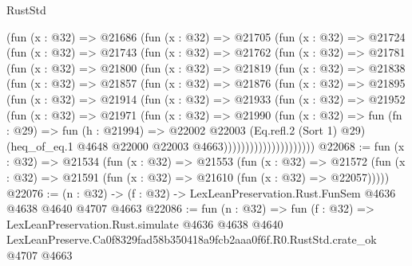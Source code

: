 \begin{lexlean}{RustStd}
\begin{coremodule}
        (fun (x : @32) =>
        @21686
          (fun (x : @32) =>
          @21705
            (fun (x : @32) =>
            @21724
              (fun (x : @32) =>
              @21743
                (fun (x : @32) =>
                @21762
                  (fun (x : @32) =>
                  @21781
                    (fun (x : @32) =>
                    @21800
                      (fun (x : @32) =>
                      @21819
                        (fun (x : @32) =>
                        @21838
                          (fun (x : @32) =>
                          @21857
                            (fun (x : @32) =>
                            @21876
                              (fun (x : @32) =>
                              @21895
                                (fun (x : @32) =>
                                @21914
                                  (fun (x : @32) =>
                                  @21933
                                    (fun (x : @32) =>
                                    @21952
                                      (fun (x : @32) =>
                                      @21971
                                        (fun (x : @32) =>
                                        @21990
                                          (fun (x : @32) =>
                                          fun (fn : @29) =>
                                          fun (h : @21994) =>
                                          @22002
                                            @22003
                                            (Eq.refl.{2} (Sort 1) @29)
                                            (heq_of_eq.{1}
                                              @4648
                                              @22000
                                              @22003
                                              @4663)))))))))))))))))))))
@22068 := fun (x : @32) =>
  @21534
    (fun (x : @32) =>
    @21553
      (fun (x : @32) =>
      @21572 (fun (x : @32) => @21591 (fun (x : @32) => @21610 (fun (x : @32) => @22057)))))
@22076 := (n : @32) -> (f : @32) -> LexLeanPreservation.Rust.FunSem @4636 @4638 @4640 @4707 @4663
@22086 := fun (n : @32) =>
  fun (f : @32) =>
  LexLeanPreservation.Rust.simulate
    @4636
    @4638
    @4640
    LexLeanPreserve.Ca0f8329fad58b350418a9fcb2aaa0f6f.R0.RustStd.crate_ok
    @4707
    @4663
\end{coremodule}
\end{lexlean}
